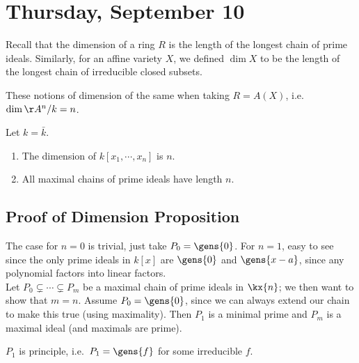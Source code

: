 \hypertarget{thursday-september-10}{%
\section{Thursday, September 10}\label{thursday-september-10}}

Recall that the dimension of a ring \(R\) is the length of the longest
chain of prime ideals. Similarly, for an affine variety \(X\), we
defined \(\dim X\) to be the length of the longest chain of irreducible
closed subsets.

These notions of dimension of the same when taking \(R = A(X)\),
i.e.~\(\dim \AA^n/k = n\).

\begin{proposition}[Dimensions]

Let \(k = \bar k\).

\begin{enumerate}
\def\labelenumi{\alph{enumi}.}
\tightlist
\item
  The dimension of \(k[x_1, \cdots, x_n]\) is \(n\).
\item
  All maximal chains of prime ideals have length \(n\).
\end{enumerate}

\end{proposition}

\hypertarget{proof-of-dimension-proposition}{%
\subsection{Proof of Dimension
Proposition}\label{proof-of-dimension-proposition}}

The case for \(n=0\) is trivial, just take \(P_0 = \gens{0}\). For
\(n=1\), easy to see since the only prime ideals in \(k[x]\) are
\(\gens{0}\) and \(\gens{x-a}\), since any polynomial factors into
linear factors.\\

Let \(P_0 \subsetneq \cdots \subsetneq P_m\) be a maximal chain of prime
ideals in \(\kx{n}\); we then want to show that \(m=n\). Assume
\(P_0 = \gens{0}\), since we can always extend our chain to make this
true (using maximality). Then \(P_1\) is a minimal prime and \(P_m\) is
a maximal ideal (and maximals are prime).

\begin{claim}

\(P_1\) is principle, i.e.~\(P_1 = \gens{f}\) for some irreducible
\(f\).

\end{claim}

